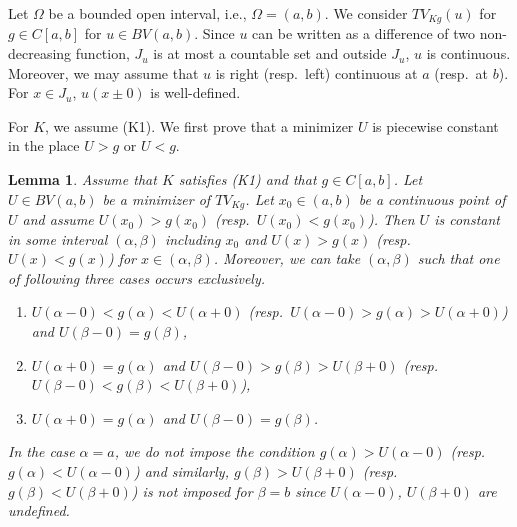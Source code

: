 \documentclass[11pt]{amsart} %
\numberwithin{equation}{section}
\newtheorem{lem}[thm]{Lemma}
\begin{document}
Let $\Omega$ be a bounded open interval, i.e., $\Omega=(a,b)$.
 We consider $TV_{Kg}(u)$ for $g\in C[a,b]$ for $u\in BV(a,b)$.
 Since $u$ can be written as a difference of two non-decreasing function, $J_u$ is at most a countable set and outside $J_u$, $u$ is continuous.
 Moreover, we may assume that $u$ is right (resp.\ left) continuous at $a$ (resp.\ at $b$).
 For $x\in J_u$, $u(x\pm0)$ is well-defined.

For $K$, we assume (K1).
 We first prove that a minimizer $U$ is piecewise constant in the place $U>g$ or $U<g$.
%
\begin{lem} \label{LPic}
Assume that $K$ satisfies (K1) and that $g\in C[a,b]$.
 Let $U\in BV(a,b)$ be a minimizer of $TV_{Kg}$.
 Let $x_0\in(a,b)$ be a continuous point of $U$ and assume $U(x_0)>g(x_0)$ (resp.\ $U(x_0)<g(x_0)$).
 Then $U$ is constant in some interval $(\alpha,\beta)$ including $x_0$ and $U(x)>g(x)$ (resp.\ $U(x)<g(x)$) for $x\in(\alpha,\beta)$.
 Moreover, we can take $(\alpha,\beta)$ such that 
one of following three cases occurs exclusively.
\begin{enumerate}
\item[(i)] $U(\alpha-0)<g(\alpha)<U(\alpha+0)$ (resp.\ $U(\alpha-0)>g(\alpha)>U(\alpha+0)$) and $U(\beta-0)=g(\beta)$,
\item[(i\hspace{-1pt}i)] $U(\alpha+0)=g(\alpha)$ and $U(\beta-0)>g(\beta)>U(\beta+0)$ (resp.\ $U(\beta-0)<g(\beta)<U(\beta+0)$),
\item[(i\hspace{-1pt}i\hspace{-1pt}i)] $U(\alpha+0)=g(\alpha)$ and $U(\beta-0)=g(\beta)$.
\end{enumerate}
In the case $\alpha=a$, we do not impose the condition $g(\alpha)>U(\alpha-0)$ (resp.\ $g(\alpha)<U(\alpha-0)$) and similarly, $g(\beta)>U(\beta+0)$ (resp.\ $g(\beta)<U(\beta+0)$) is not imposed for $\beta=b$ since $U(\alpha-0)$, $U(\beta+0)$ are undefined.
\end{lem}
%
\end{document}
